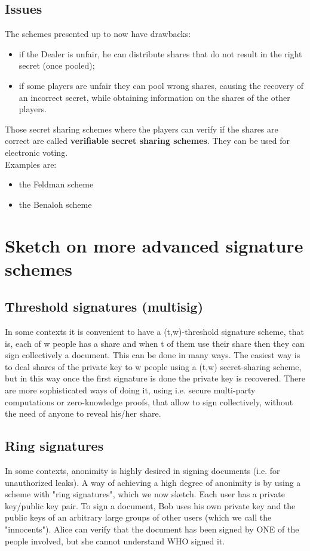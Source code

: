 \documentclass[a4paper, 10pt, titlepage]{article}
\begin{document}
\subsection{Issues}
The schemes presented up to now have drawbacks:
\begin{itemize}
\item if the Dealer is unfair, he can distribute shares that do not result in the right secret (once pooled);
\item if some players are unfair they can pool wrong shares, causing the recovery of an incorrect secret, while obtaining information on the shares of the other players.
\end{itemize}
Those secret sharing schemes where the players can verify if the shares are correct are called \textbf{verifiable secret sharing schemes}. They can be used for electronic voting.\\
Examples are:
\begin{itemize}
\item the Feldman scheme
\item the Benaloh scheme
\end{itemize}

\section{Sketch on more advanced signature schemes}
\subsection{Threshold signatures (multisig)}
In some contexts it is convenient to have a (t,w)-threshold signature scheme, that is, each of w people has a share and when t of them use their share then they can sign collectively a document.
This can be done in many ways. The easiest way is to deal shares of the private key to w people using a (t,w) secret-sharing scheme, but in this way once the first signature is done the private key is recovered.
There are more sophisticated ways of doing it, using i.e. secure multi-party computations or zero-knowledge proofs, that allow to sign collectively, without the need of anyone to reveal his/her share.

\subsection{Ring signatures}
In some contexts, anonimity is highly desired in signing documents (i.e. for unauthorized leaks).
A way of achieving a high degree of anonimity is by using a scheme with "ring signatures", which we now sketch.
Each user has a private key/public key pair. To sign a document, Bob uses his own private key and the public keys of an arbitrary large groups of other users (which we call the "innocents"). Alice can verify that the document has been signed by ONE of the people involved, but she cannot understand WHO signed it.
\end{document}
